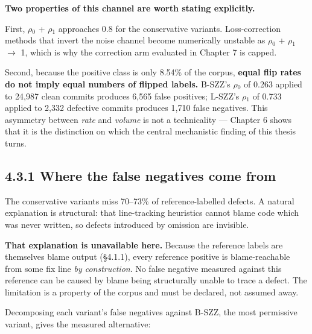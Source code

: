 \textbf{Two properties of this channel are worth stating explicitly.}

First, \ensuremath{\rho}\ensuremath{_0} + \ensuremath{\rho}\ensuremath{_1} approaches 0.8 for the conservative variants.
Loss-correction methods that invert the noise channel become numerically
unstable as \ensuremath{\rho}\ensuremath{_0} + \ensuremath{\rho}\ensuremath{_1} \ensuremath{\rightarrow} 1, which is why the correction arm evaluated in
Chapter 7 is capped.

Second, because the positive class is only 8.54\% of the corpus,
\textbf{equal flip rates do not imply equal numbers of flipped labels.}
B-SZZ's \ensuremath{\rho}\ensuremath{_0} of 0.263 applied to 24,987 clean commits produces 6,565 false
positives; L-SZZ's \ensuremath{\rho}\ensuremath{_1} of 0.733 applied to 2,332 defective commits
produces 1,710 false negatives. This asymmetry between \emph{rate} and
\emph{volume} is not a technicality --- Chapter 6 shows that it is the
distinction on which the central mechanistic finding of this thesis
turns.

\subsection{4.3.1 Where the false negatives come
from}\label{where-the-false-negatives-come-from}

The conservative variants miss 70--73\% of reference-labelled defects. A
natural explanation is structural: that line-tracking heuristics cannot
blame code which was never written, so defects introduced by omission
are invisible.

\textbf{That explanation is unavailable here.} Because the reference
labels are themselves blame output (\S{}4.1.1), every reference positive is
blame-reachable from some fix line \emph{by construction}. No false
negative measured against this reference can be caused by blame being
structurally unable to trace a defect. The limitation is a property of
the corpus and must be declared, not assumed away.

Decomposing each variant's false negatives against B-SZZ, the most
permissive variant, gives the measured alternative:

